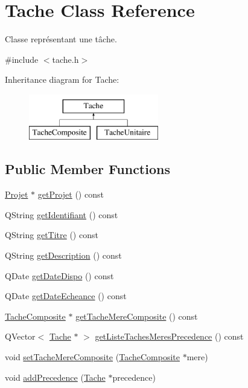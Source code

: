 \hypertarget{class_tache}{}\section{Tache Class Reference}
\label{class_tache}


Classe représentant une tâche.  




{\ttfamily \#include $<$tache.\+h$>$}

Inheritance diagram for Tache\+:\begin{figure}[H]
\begin{center}
\leavevmode
\includegraphics[height=2.000000cm]{class_tache}
\end{center}
\end{figure}
\subsection*{Public Member Functions}
\begin{DoxyCompactItemize}
\item 
\hyperlink{class_projet}{Projet} $\ast$ \hyperlink{class_tache_aa6d1abc3712b5a8b571bb3c131129ac7}{get\+Projet} () const 
\item 
Q\+String \hyperlink{class_tache_aff63994ef1fe1b96cf14540f954e45c0}{get\+Identifiant} () const 
\item 
Q\+String \hyperlink{class_tache_ab9e56c6eaaa23d2c66148ff5a89724e6}{get\+Titre} () const 
\item 
Q\+String \hyperlink{class_tache_a02954f46ea1310fb0d5ceceeb94298cc}{get\+Description} () const 
\item 
Q\+Date \hyperlink{class_tache_a5f7e485d64f7e72042e1f0ad5f378df4}{get\+Date\+Dispo} () const 
\item 
Q\+Date \hyperlink{class_tache_ad44bf074be085367c3a58b81be680d70}{get\+Date\+Echeance} () const 
\item 
\hyperlink{class_tache_composite}{Tache\+Composite} $\ast$ \hyperlink{class_tache_a5d8c5f16db0287ed0539c9206f244e02}{get\+Tache\+Mere\+Composite} () const 
\item 
Q\+Vector$<$ \hyperlink{class_tache}{Tache} $\ast$ $>$ \hyperlink{class_tache_afa1e10f04b303908477feee22241820f}{get\+Liste\+Taches\+Meres\+Precedence} () const 
\item 
void \hyperlink{class_tache_ad5ed4f92ccbc0895813908c750d918a2}{set\+Tache\+Mere\+Composite} (\hyperlink{class_tache_composite}{Tache\+Composite} $\ast$mere)
\item 
void \hyperlink{class_tache_a10659477f457bc4ceafbee41b155eb66}{add\+Precedence} (\hyperlink{class_tache}{Tache} $\ast$precedence)
\end{DoxyCompactItemize}

